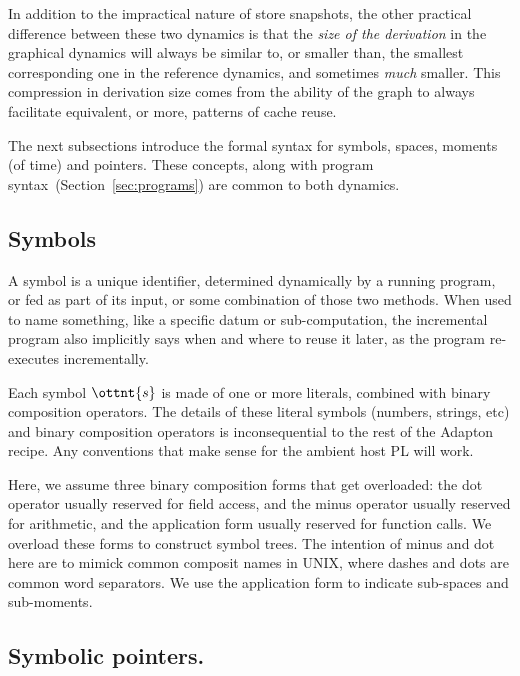 \documentclass[11pt]{article}
\begin{document}
In addition to the impractical nature of store snapshots, the other practical
difference between these two dynamics is that the \emph{size of the
derivation} in the graphical dynamics will always be similar to, or
smaller than, the smallest corresponding one in the reference
dynamics, and sometimes \emph{much} smaller.
%
This compression in derivation size comes from the ability of the
graph to always facilitate equivalent, or more, patterns of cache reuse.

The next subsections introduce the formal syntax for symbols, spaces, moments (of time) and pointers.
%
These concepts, along with program syntax~(Section~\ref{sec:programs}) are common to both dynamics.

\subsection{Symbols}
\label{sec:symbols}

A symbol is a
unique identifier, determined dynamically by a running program, or fed
as part of its input, or some combination of those two methods.
%
When used to name something, like a specific datum or sub-computation,
the incremental program also implicitly says when and where to reuse
it later, as the program re-executes incrementally.

\ottgrammartabular{
  \otts
}

Each symbol $\ottnt{s}$ is made of one or more literals,
combined with binary composition operators.
%
The details of these literal symbols (numbers, strings, etc) and
binary composition operators is inconsequential to the rest of the
Adapton recipe.  Any conventions that make sense for the ambient host PL will work.

Here, we assume three binary composition forms that get overloaded: the
dot operator usually reserved for field access, and the minus operator
usually reserved for arithmetic, and the application form usually reserved for function calls.
%
We overload these forms to construct symbol trees.
%
The intention of minus and dot here are to mimick common composit
names in UNIX, where dashes and dots are common word separators.
%
We use the application form to indicate sub-spaces and sub-moments.

\subsection{Symbolic pointers.}
\label{sec:symbolic-pointers}
\end{document}
